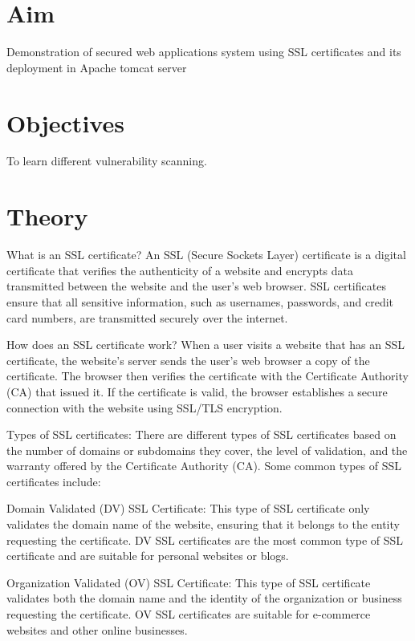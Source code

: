 \documentclass[11pt]{article}
\begin{document}
\tableofcontents
\thispagestyle{empty}
\clearpage

\setcounter{page}{1}

\section{Aim}

Demonstration of secured web applications system using SSL certificates and its
deployment in Apache tomcat server

\section{Objectives}
To learn different vulnerability scanning.

\section{Theory}

What is an SSL certificate?
An SSL (Secure Sockets Layer) certificate is a digital certificate that verifies the authenticity of a website and encrypts data transmitted between the website and the user's web browser. SSL certificates ensure that all sensitive information, such as usernames, passwords, and credit card numbers, are transmitted securely over the internet.

How does an SSL certificate work?
When a user visits a website that has an SSL certificate, the website's server sends the user's web browser a copy of the certificate. The browser then verifies the certificate with the Certificate Authority (CA) that issued it. If the certificate is valid, the browser establishes a secure connection with the website using SSL/TLS encryption.

Types of SSL certificates:
There are different types of SSL certificates based on the number of domains or subdomains they cover, the level of validation, and the warranty offered by the Certificate Authority (CA). Some common types of SSL certificates include:

Domain Validated (DV) SSL Certificate: This type of SSL certificate only validates the domain name of the website, ensuring that it belongs to the entity requesting the certificate. DV SSL certificates are the most common type of SSL certificate and are suitable for personal websites or blogs.

Organization Validated (OV) SSL Certificate: This type of SSL certificate validates both the domain name and the identity of the organization or business requesting the certificate. OV SSL certificates are suitable for e-commerce websites and other online businesses.
\end{document}
